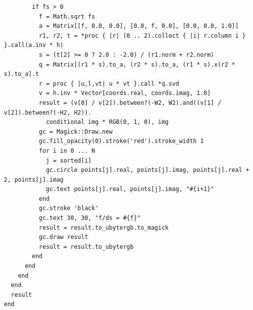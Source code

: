 \documentclass[12pt,a4paper,oneside,openright]{book}
\begin{document}
\begin{CJK}{UTF8}{}
\begin{lstlisting}
        if fs > 0
          f = Math.sqrt fs
          a = Matrix[[f, 0.0, 0.0], [0.0, f, 0.0], [0.0, 0.0, 1.0]]
          r1, r2, t = *proc { |r| (0 .. 2).collect { |i| r.column i } }.call(a.inv * h)
          s = (t[2] >= 0 ? 2.0 : -2.0) / (r1.norm + r2.norm)
          q = Matrix[(r1 * s).to_a, (r2 * s).to_a, (r1 * s).x(r2 * s).to_a].t
          r = proc { |u,l,vt| u * vt }.call *q.svd
          v = h.inv * Vector[coords.real, coords.imag, 1.0]
          result = (v[0] / v[2]).between?(-W2, W2).and((v[1] / v[2]).between?(-H2, H2)).
            conditional img * RGB(0, 1, 0), img
          gc = Magick::Draw.new
          gc.fill_opacity(0).stroke('red').stroke_width 1
          for i in 0 ... N
            j = sorted[i]
            gc.circle points[j].real, points[j].imag, points[j].real + 2, points[j].imag
            gc.text points[j].real, points[j].imag, "#{i+1}"
          end
          gc.stroke 'black'
          gc.text 30, 30, "f/ds = #{f}"
          result = result.to_ubytergb.to_magick
          gc.draw result
          result = result.to_ubytergb
        end
      end
    end
  end
  result
end
\end{lstlisting}


\end{CJK}
\end{document}
